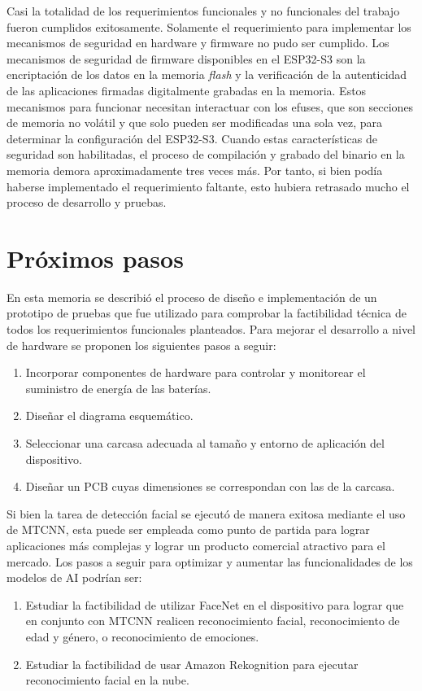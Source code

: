 Casi la totalidad de los requerimientos funcionales y no funcionales del trabajo fueron cumplidos exitosamente. Solamente el requerimiento para implementar los mecanismos de seguridad en hardware y firmware no pudo ser cumplido. Los mecanismos de seguridad de firmware disponibles en el ESP32-S3 son la encriptación de los datos en la memoria \textit{flash} y la verificación de la autenticidad de las aplicaciones firmadas digitalmente grabadas en la memoria. Estos mecanismos para funcionar necesitan interactuar con los efuses, que son secciones de memoria no volátil y que solo pueden ser modificadas una sola vez, para determinar la configuración del ESP32-S3. Cuando estas características de seguridad son habilitadas, el proceso de compilación y grabado del binario en la memoria demora aproximadamente tres veces más. Por tanto, si bien podía haberse implementado el requerimiento faltante, esto hubiera retrasado mucho el proceso de desarrollo y pruebas.

\section{Próximos pasos}
En esta memoria se describió el proceso de diseño e implementación de un prototipo de pruebas que fue utilizado para comprobar la factibilidad técnica de todos los requerimientos funcionales planteados. Para mejorar el desarrollo a nivel de hardware se proponen los siguientes pasos a seguir:
\begin{enumerate}
	\item Incorporar componentes de hardware para controlar y monitorear el suministro de energía de las baterías.
	\item Diseñar el diagrama esquemático.
	\item Seleccionar una carcasa adecuada al tamaño y entorno de aplicación del dispositivo.
	\item Diseñar un PCB cuyas dimensiones se correspondan con las de la carcasa.
\end{enumerate}

Si bien la tarea de detección facial se ejecutó de manera exitosa mediante el uso de MTCNN, esta puede ser empleada como punto de partida para lograr aplicaciones más complejas y lograr un producto comercial atractivo para el mercado. Los pasos a seguir para optimizar y aumentar las funcionalidades de los modelos de AI podrían ser:
\begin{enumerate}
	\item Estudiar la factibilidad de utilizar FaceNet en el dispositivo para lograr que en conjunto con MTCNN realicen reconocimiento facial, reconocimiento de edad y género, o reconocimiento de emociones.
	\item Estudiar la factibilidad de usar Amazon Rekognition para ejecutar reconocimiento facial en la nube.
\end{enumerate}